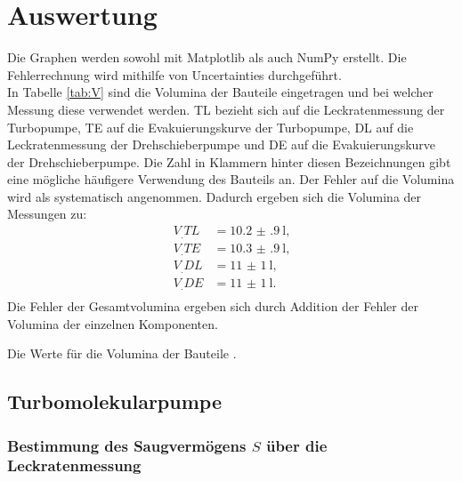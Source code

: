 \section{Auswertung}
\label{sec:Auswertung}

Die Graphen werden sowohl mit Matplotlib \cite{matplotlib} als auch NumPy \cite{numpy} erstellt. Die Fehlerrechnung wird mithilfe von Uncertainties \cite{uncertainties} durchgeführt.\\
In Tabelle \ref{tab:V} sind die Volumina der Bauteile eingetragen und bei welcher Messung diese verwendet werden. TL bezieht sich auf die Leckratenmessung der Turbopumpe, TE auf die Evakuierungskurve der Turbopumpe, DL auf die Leckratenmessung der Drehschieberpumpe und DE auf die Evakuierungskurve der Drehschieberpumpe. Die Zahl in Klammern hinter diesen Bezeichnungen gibt eine mögliche häufigere Verwendung des Bauteils an. Der Fehler auf die Volumina wird als systematisch angenommen.
Dadurch ergeben sich die Volumina der Messungen zu:
\begin{align}
V_.{TL}	&= \SI{10.2(9)}{\litre}\text{,}\\
V_.{TE}	&= \SI{10.3(9)}{\litre}\text{,}\\
V_.{DL}	&= \SI{11(1)}{\litre}\text{,}\\
V_.{DE}	&= \SI{11(1)}{\litre}\text{.}\\
\end{align}
Die Fehler der Gesamtvolumina ergeben sich durch Addition der Fehler der Volumina der einzelnen Komponenten. 

\begin{table}
\centering
\caption{Die Werte für die Volumina der Bauteile \cite{V70}.}

\label{tab:V}
\end{table}

\subsection{Turbomolekularpumpe}

\subsubsection{Bestimmung des Saugvermögens $S$ über die Leckratenmessung}

